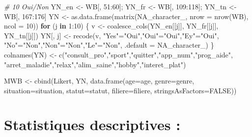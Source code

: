 \documentclass[
]{article}
\newenvironment{Shaded}{\begin{snugshade}}{\end{snugshade}}
\newcommand{\AttributeTok}[1]{\textcolor[rgb]{0.77,0.63,0.00}{#1}}
\newcommand{\CommentTok}[1]{\textcolor[rgb]{0.56,0.35,0.01}{\textit{#1}}}
\newcommand{\ConstantTok}[1]{\textcolor[rgb]{0.00,0.00,0.00}{#1}}
\newcommand{\ControlFlowTok}[1]{\textcolor[rgb]{0.13,0.29,0.53}{\textbf{#1}}}
\newcommand{\DecValTok}[1]{\textcolor[rgb]{0.00,0.00,0.81}{#1}}
\newcommand{\FunctionTok}[1]{\textcolor[rgb]{0.00,0.00,0.00}{#1}}
\newcommand{\NormalTok}[1]{#1}
\newcommand{\OtherTok}[1]{\textcolor[rgb]{0.56,0.35,0.01}{#1}}
\newcommand{\SpecialCharTok}[1]{\textcolor[rgb]{0.00,0.00,0.00}{#1}}
\newcommand{\StringTok}[1]{\textcolor[rgb]{0.31,0.60,0.02}{#1}}
\begin{document}
\begin{Shaded}
\begin{Highlighting}[]
\CommentTok{\# 10 Oui/Non}
\NormalTok{YN\_en }\OtherTok{\textless{}{-}}\NormalTok{ WB[, }\DecValTok{51}\SpecialCharTok{:}\DecValTok{60}\NormalTok{]; YN\_fr }\OtherTok{\textless{}{-}}\NormalTok{ WB[, }\DecValTok{109}\SpecialCharTok{:}\DecValTok{118}\NormalTok{]; YN\_tn }\OtherTok{\textless{}{-}}\NormalTok{ WB[, }\DecValTok{167}\SpecialCharTok{:}\DecValTok{176}\NormalTok{]}
\NormalTok{YN }\OtherTok{\textless{}{-}} \FunctionTok{as.data.frame}\NormalTok{(}\FunctionTok{matrix}\NormalTok{(}\ConstantTok{NA\_character\_}\NormalTok{, }\AttributeTok{nrow =} \FunctionTok{nrow}\NormalTok{(WB), }\AttributeTok{ncol =} \DecValTok{10}\NormalTok{))}
\ControlFlowTok{for}\NormalTok{ (j }\ControlFlowTok{in} \DecValTok{1}\SpecialCharTok{:}\DecValTok{10}\NormalTok{) \{}
\NormalTok{  v }\OtherTok{\textless{}{-}} \FunctionTok{coalesce\_cols}\NormalTok{(YN\_en[[j]], YN\_fr[[j]], YN\_tn[[j]])}
\NormalTok{  YN[, j] }\OtherTok{\textless{}{-}} \FunctionTok{recode}\NormalTok{(v, }\StringTok{"Yes"}\OtherTok{=}\StringTok{"Oui"}\NormalTok{,}\StringTok{"Oui"}\OtherTok{=}\StringTok{"Oui"}\NormalTok{,}\StringTok{"Ey"}\OtherTok{=}\StringTok{"Oui"}\NormalTok{,}
                       \StringTok{"No"}\OtherTok{=}\StringTok{"Non"}\NormalTok{,}\StringTok{"Non"}\OtherTok{=}\StringTok{"Non"}\NormalTok{,}\StringTok{"Le"}\OtherTok{=}\StringTok{"Non"}\NormalTok{, }\AttributeTok{.default =} \ConstantTok{NA\_character\_}\NormalTok{)}
\NormalTok{\}}
\FunctionTok{colnames}\NormalTok{(YN) }\OtherTok{\textless{}{-}} \FunctionTok{c}\NormalTok{(}\StringTok{"consult\_pro"}\NormalTok{,}\StringTok{"sport"}\NormalTok{,}\StringTok{"quitter"}\NormalTok{,}\StringTok{"app\_num"}\NormalTok{,}\StringTok{"prog\_aide"}\NormalTok{,}
                  \StringTok{"arret\_maladie"}\NormalTok{,}\StringTok{"relax"}\NormalTok{,}\StringTok{"alim\_saine"}\NormalTok{,}\StringTok{"hobby"}\NormalTok{,}\StringTok{"interet\_plat"}\NormalTok{)}

\NormalTok{MWB }\OtherTok{\textless{}{-}} \FunctionTok{cbind}\NormalTok{(Likert, YN,}
             \FunctionTok{data.frame}\NormalTok{(}\AttributeTok{age=}\NormalTok{age, }\AttributeTok{genre=}\NormalTok{genre, }\AttributeTok{situation=}\NormalTok{situation,}
                        \AttributeTok{statut=}\NormalTok{statut, }\AttributeTok{filiere=}\NormalTok{filiere, }\AttributeTok{stringsAsFactors=}\ConstantTok{FALSE}\NormalTok{))}
\end{Highlighting}
\end{Shaded}

\hypertarget{statistiques-descriptives}{%
\section{Statistiques descriptives :}\label{statistiques-descriptives}}
\end{document}
